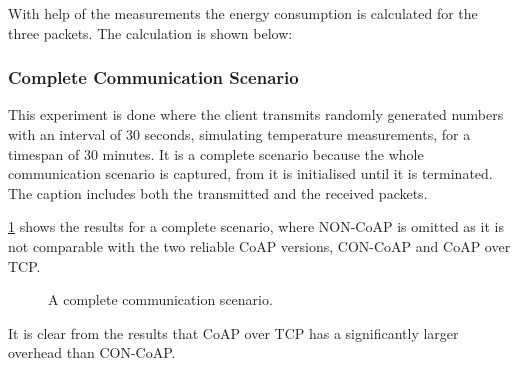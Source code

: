 With help of the measurements the energy consumption is calculated for the three packets. The calculation is shown below:


\subsubsection{Complete Communication Scenario}
This experiment is done where the client transmits randomly generated numbers with an interval of 30 seconds, simulating temperature measurements, for a timespan of 30 minutes.
It is a complete scenario because the whole communication scenario is captured, from it is initialised until it is terminated. The caption includes both the transmitted and the received packets.

\figurename{\ref{fig:completescenario}} shows the results for a complete scenario, where NON-CoAP is omitted as it is not comparable with the two reliable CoAP versions, CON-CoAP and CoAP over TCP. 
\begin{figure}[bht]
	\caption{A complete communication scenario.}
	\label{fig:completescenario}
\end{figure}

It is clear from the results that CoAP over TCP has a significantly larger overhead than CON-CoAP.

